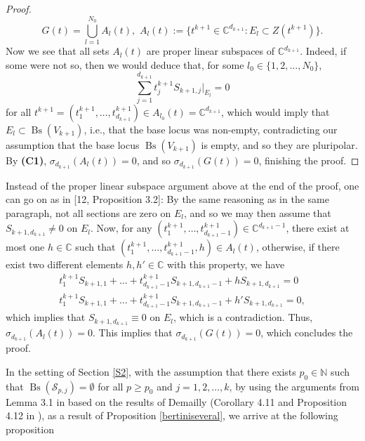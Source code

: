 \documentclass[11pt,leqno,oneside]{amsart}
\numberwithin{equation}{section}
\begin{document}
\begin{proof}
\begin{equation}
		G(t)=\bigcup_{l=1}^{N_{0}}{A_{l}(t)}, \,\,A_{l}(t):=\{t^{k+1} \in \mathbb{C}^{d_{k+1}}: E_{l} \subset Z(t^{k+1})\}.
	\end{equation}Now we see that all sets $A_{l}(t)$ are proper linear subspaces of $\mathbb{C}^{d_{k+1}}$. Indeed, if some were not so, then we would deduce that, for some $l_{0} \in \{1, 2, \ldots, N_{0}\}$, $$\sum_{j=1}^{d_{k+1}}{t^{k+1}_{j}S_{k+1, j}|_{E_{l}}}=0$$ for all $t^{k+1}=(t^{k+1}_{1}, \ldots, t^{k+1}_{d_{k+1}}) \in A_{l_{0}}(t)=\mathbb{C}^{d_{k+1}}$, which would imply that $E_{l} \subset \operatorname{Bs}(V_{k+1})$, i.e., that the base locus was non-empty, contradicting our assumption that the base locus $\operatorname{Bs}(V_{k+1})$ is empty, and so they are pluripolar. By \textbf{(C1)}, $\sigma_{d_{k+1}}(A_{l}(t))=0$, and so $\sigma_{d_{k+1}}(G(t))=0$, finishing the proof. \end{proof}

Instead of the proper linear subspace argument above at the end of the proof, one can go on as in [12, Proposition 3.2]: By the same reasoning as in the same paragraph, not all sections are zero on $E_{l}$, and so we may then assume that $S_{k+1, d_{k+1}} \neq 0$ on $E_{l}$. Now, for any $(t^{k+1}_{1}, \ldots, t^{k+1}_{d_{k+1}-1}) \in \mathbb{C}^{d_{k+1}-1}$, there exist at most one $h\in \mathbb{C}$ such that $(t^{k+1}_{1}, \ldots, t^{k+1}_{d_{k+1}-1}, h) \in A_{l}(t)$, otherwise, if there exist two different elements $h, h' \in \mathbb{C}$ with this property, we have \begin{align*}\label{sonic}
		t^{k+1}_{1} S_{k+1, 1} + \ldots + t^{k+1}_{d_{k+1}-1} S_{k+1, d_{k+1}-1} + h S_{k+1, d_{k+1}}=0 \\
		t^{k+1}_{1} S_{k+1, 1} + \ldots + t^{k+1}_{d_{k+1}-1} S_{k+1, d_{k+1}-1} + h' S_{k+1, d_{k+1}}=0,
	\end{align*}which implies that $S_{k+1, d_{k+1}} \equiv 0$ on $E_{l}$, which is a contradiction. Thus, $\sigma_{d_{k+1}}(A_{l}(t))=0$. This implies that $\sigma_{d_{k+1}}(G(t))=0$, which concludes the proof.





\vspace{3mm}


In the setting of Section \ref{S2}, with the assumption that there exists $p_{0} \in \mathbb{N}$ such that $\operatorname{Bs}(\mathcal{S}_{p, j}) =\emptyset$ for all $p \geq p_{0}$ and $j=1, 2, \ldots, k$, by using the arguments from Lemma 3.1 in \cite{CLMM} based on the results of Demailly (Corollary 4.11 and Proposition 4.12 in \cite{Dem12}), as a result of Proposition \ref{bertiniseveral}, we arrive at the following proposition
\end{document}
